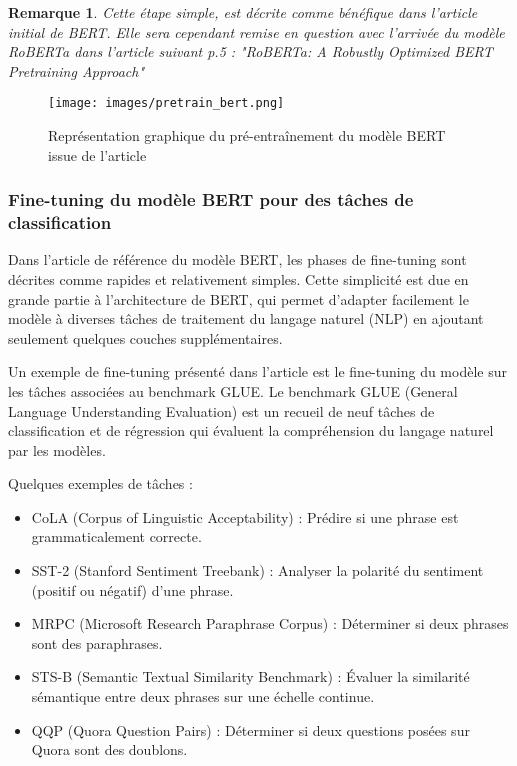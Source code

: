\documentclass[12pt]{article}
\newtheorem{rmq}{Remarque}
\theoremstyle{definition}
\begin{document}
\begin{rmq}
	Cette étape simple, est décrite comme bénéfique dans l’article initial de BERT. Elle sera cependant remise en question avec l’arrivée du modèle RoBERTa dans l’article suivant p.5 : "RoBERTa: A Robustly Optimized BERT Pretraining Approach" \cite{robert}
\end{rmq}


 \begin{figure*}[!h]
	\centering
	\texttt{[image: images/pretrain\_bert.png]}
	\caption{Représentation graphique du pré-entraînement du modèle BERT issue de l'article \cite{bert_paper}}
\end{figure*}



\subsubsection{Fine-tuning du modèle BERT pour des tâches de classification}

Dans l’article de référence du modèle BERT, les phases de fine-tuning sont décrites comme rapides et relativement simples. Cette simplicité est due en grande partie à l'architecture de BERT, qui permet d'adapter facilement le modèle à diverses tâches de traitement du langage naturel (NLP) en ajoutant seulement quelques couches supplémentaires. 

Un exemple de fine-tuning présenté dans l’article est le fine-tuning du modèle sur les tâches associées au benchmark GLUE. Le benchmark GLUE (General Language Understanding Evaluation) est un recueil de neuf tâches de classification et de régression qui évaluent la compréhension du langage naturel par les modèles. 

Quelques exemples de tâches :

\begin{itemize}
	\item CoLA (Corpus of Linguistic Acceptability) : Prédire si une phrase est grammaticalement correcte.
	\item SST-2 (Stanford Sentiment Treebank) : Analyser la polarité du sentiment (positif ou négatif) d'une phrase.
	\item MRPC (Microsoft Research Paraphrase Corpus) : Déterminer si deux phrases sont des paraphrases.
	\item STS-B (Semantic Textual Similarity Benchmark) : Évaluer la similarité sémantique entre deux phrases sur une échelle continue.
	\item QQP (Quora Question Pairs) : Déterminer si deux questions posées sur Quora sont des doublons.
	
\end{itemize}
\end{document}
